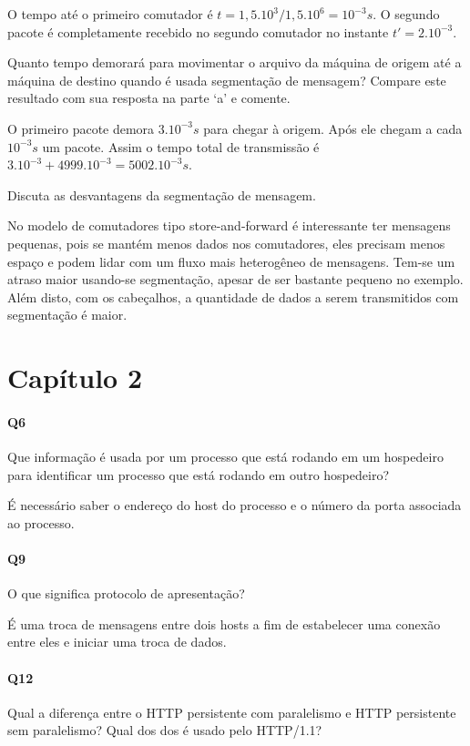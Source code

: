 O tempo até o primeiro comutador é $t = 1,5.10^3/1,5.10^6 = 10^{-3}s$. O segundo pacote é completamente recebido no segundo comutador no instante $t' = 2.10^{-3}$.

 Quanto tempo demorará para movimentar o arquivo da máquina de origem até a máquina de destino quando é usada segmentação de mensagem? Compare este resultado com sua resposta na parte `a' e comente.

O primeiro pacote demora $3.10^{-3}s$ para chegar à origem. Após ele chegam a cada $10^{-3}s$ um pacote. 
Assim o tempo total de transmissão é $3 . 10^{-3} + 4999 . 10^{-3} = 5002 . 10^{-3}s$.

 Discuta as desvantagens da segmentação de mensagem.

No modelo de comutadores tipo store-and-forward é interessante ter mensagens pequenas, pois se mantém menos dados nos comutadores, eles precisam menos espaço e podem lidar com um fluxo mais heterogêneo de mensagens. Tem-se um atraso maior usando-se segmentação, apesar de ser bastante pequeno no exemplo.
Além disto, com os cabeçalhos, a quantidade de dados a serem transmitidos com segmentação é maior.

\section{Capítulo 2}

\paragraph{Q6} Que informação é usada por um processo que está rodando em um hospedeiro para identificar um processo que está rodando em outro hospedeiro?

É necessário saber o endereço do host do processo e o número da porta associada ao processo.

\paragraph{Q9} O que significa protocolo de apresentação?

É uma troca de mensagens entre dois hosts a fim de estabelecer uma conexão entre eles e iniciar uma troca de dados.

\paragraph{Q12} Qual a diferença entre o HTTP persistente com paralelismo e HTTP persistente sem paralelismo? Qual dos dos é usado pelo HTTP/1.1?

